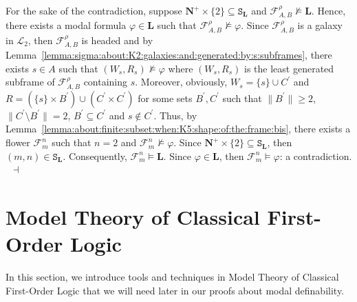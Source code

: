 \documentclass[draft]{article}
\newenvironment{proof}{{\bf Proof:}}{~$\dashv$\\}
\def\L{\mathbf{L}}
\begin{document}
%
%
\begin{proof}
%
%
For the sake of the contradiction, suppose $\mathbf{N}^{+}{\times}\{2\}{\subseteq}\mathtt{S}_{\L}$ and ${\mathcal F}^{\rho}_{A,B}{\not\models}\L$.
Hence, there exists a modal formula $\varphi{\in}\L$ such that ${\mathcal F}^{\rho}_{A,B}{\not\models}\varphi$.
Since ${\mathcal F}^{\rho}_{A,B}$ is a galaxy in ${\mathcal L}_{2}$, then ${\mathcal F}^{\rho}_{A,B}$ is headed and by Lemma~\ref{lemma:sigma:about:K2:galaxies:and:generated:by:s:subframes}, there exists $s{\in}A$ such that $(W_{s},R_{s}){\not\models}\varphi$ where $(W_{s},R_{s})$ is the least generated subframe of ${\mathcal F}_{A,B}^{\rho}$ containing $s$.
Moreover, obviously, $W_{s}{=}\{s\}{\cup}C^{\prime}$ and $R{=}(\{s\}{\times}B^{\prime}){\cup}(C^{\prime}{\times}C^{\prime})$ for some sets $B^{\prime},C^{\prime}$ such that ${\parallel}B^{\prime}{\parallel}{\geq}2$, ${\parallel}C^{\prime}{\setminus}B^{\prime}{\parallel}{=}2$, $B^{\prime}{\subseteq}C^{\prime}$ and $s{\not\in}C^{\prime}$.
Thus, by Lemma~\ref{lemma:about:finite:subset:when:K5:shape:of:the:frame:bis}, there exists a flower ${\mathcal F}_{m}^{n}$ such that $n{=}2$ and ${\mathcal F}_{m}^{n}{\not\models}\varphi$.
Since $\mathbf{N}^{+}{\times}\{2\}{\subseteq}\mathtt{S}_{\L}$, then $(m,n){\in}\mathtt{S}_{\L}$.
Consequently, ${\mathcal F}_{m}^{n}{\models}\L$.
Since $\varphi{\in}\L$, then ${\mathcal F}_{m}^{n}{\models}\varphi$: a contradiction.
%
%
\medskip
%
%
\end{proof}
%
%
%
%
\section{Model Theory of Classical First-Order Logic}\label{section:first:order:syntax:and:semantics}
%
%
In this section, we introduce tools and techniques in Model Theory of Classical First-Order Logic that we will need later in our proofs about modal definability.
%
%
%
%
\end{document}
